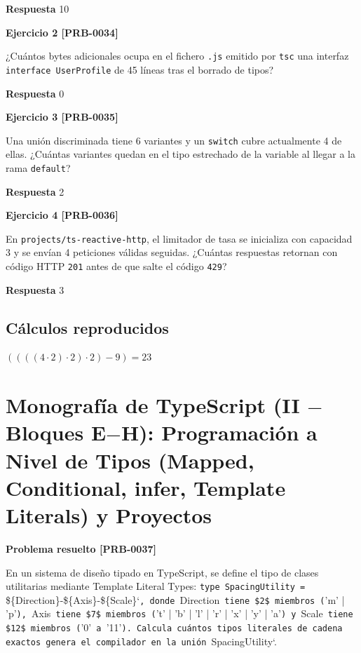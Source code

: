 \documentclass{book}
\begin{document}
\noindent\textbf{Respuesta} 10

\noindent\textbf{Ejercicio 2 [PRB-0034]}

¿Cuántos bytes adicionales ocupa en el fichero \texttt{.js} emitido por \texttt{tsc} una interfaz \texttt{interface UserProfile} de 45 líneas tras el borrado de tipos?

\noindent\textbf{Respuesta} 0

\noindent\textbf{Ejercicio 3 [PRB-0035]}

Una unión discriminada tiene 6 variantes y un \texttt{switch} cubre actualmente 4 de ellas. ¿Cuántas variantes quedan en el tipo estrechado de la variable al llegar a la rama \texttt{default}?

\noindent\textbf{Respuesta} 2

\noindent\textbf{Ejercicio 4 [PRB-0036]}

En \texttt{projects/ts-reactive-http}, el limitador de tasa se inicializa con capacidad 3 y se envían 4 peticiones válidas seguidas. ¿Cuántas respuestas retornan con código HTTP \texttt{201} antes de que salte el código \texttt{429}?

\noindent\textbf{Respuesta} 3

\subsection*{Cálculos reproducidos}

\(\left(\left(\left(\left(4\cdot 2\right)\cdot 2\right)\cdot 2\right)-9\right) = 23\)

\section{Monografía de TypeScript (II \(-\) Bloques E\(-\)H): Programación a Nivel de Tipos (Mapped, Conditional, infer, Template Literals) y Proyectos}

\noindent\textbf{Problema resuelto [PRB-0037]}

En un sistema de diseño tipado en TypeScript, se define el tipo de clases utilitarias mediante Template Literal Types: \texttt{type SpacingUtility = }\$\{Direction\}-\$\{Axis\}-\$\{Scale\}`\texttt{, donde }Direction\texttt{ tiene \$2\$ miembros (}'m' | 'p'\texttt{), }Axis\texttt{ tiene \$7\$ miembros (}'t' | 'b' | 'l' | 'r' | 'x' | 'y' | 'a'\texttt{) y }Scale\texttt{ tiene \$12\$ miembros (}'0'\texttt{ a }'11'\texttt{). Calcula cu{\'a}ntos tipos literales de cadena exactos genera el compilador en la uni{\'o}n }SpacingUtility`.
\end{document}
